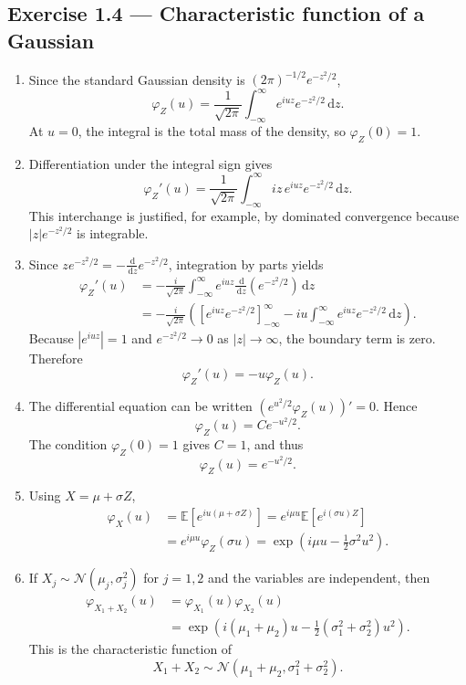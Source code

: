 \documentclass[11pt]{article}
\newcommand{\E}{\mathbb{E}}
\newcommand{\1}{\mathbf{1}}
\newcommand{\dd}{\,\mathrm{d}}
\begin{document}
\subsection*{Exercise 1.4 --- Characteristic function of a Gaussian}
\begin{enumerate}
  \item Since the standard Gaussian density is
  $(2\pi)^{-1/2}e^{-z^2/2}$,
  \[
  \varphi_Z(u)
  =\frac1{\sqrt{2\pi}}
    \int_{-\infty}^{\infty}e^{iuz}e^{-z^2/2}\dd z.
  \]
  At $u=0$, the integral is the total mass of the density, so
  $\varphi_Z(0)=1$.

  \item Differentiation under the integral sign gives
  \[
  \varphi_Z'(u)
  =\frac1{\sqrt{2\pi}}
    \int_{-\infty}^{\infty}iz\,e^{iuz}e^{-z^2/2}\dd z.
  \]
  This interchange is justified, for example, by dominated convergence
  because $|z|e^{-z^2/2}$ is integrable.

  \item Since
  $z e^{-z^2/2}=-\frac{\dd}{\dd z}e^{-z^2/2}$, integration by parts yields
  \begin{align*}
  \varphi_Z'(u)
  &=-\frac{i}{\sqrt{2\pi}}
    \int_{-\infty}^{\infty}e^{iuz}
    \frac{\dd}{\dd z}\!\left(e^{-z^2/2}\right)\dd z\\
  &=-\frac{i}{\sqrt{2\pi}}
    \left(
      \left[e^{iuz}e^{-z^2/2}\right]_{-\infty}^{\infty}
      -iu\int_{-\infty}^{\infty}e^{iuz}e^{-z^2/2}\dd z
    \right).
  \end{align*}
  Because $|e^{iuz}|=1$ and $e^{-z^2/2}\to0$ as $|z|\to\infty$, the
  boundary term is zero. Therefore
  \[
  \varphi_Z'(u)=-u\varphi_Z(u).
  \]

  \item The differential equation can be written
  $(e^{u^2/2}\varphi_Z(u))'=0$. Hence
  \[
  \varphi_Z(u)=C e^{-u^2/2}.
  \]
  The condition $\varphi_Z(0)=1$ gives $C=1$, and thus
  \[
  \boxed{\varphi_Z(u)=e^{-u^2/2}.}
  \]

  \item Using $X=\mu+\sigma Z$,
  \begin{align*}
  \varphi_X(u)
  &=\E[e^{iu(\mu+\sigma Z)}]
    =e^{i\mu u}\E[e^{i(\sigma u)Z}]\\
  &=e^{i\mu u}\varphi_Z(\sigma u)
    =\boxed{\exp\!\left(i\mu u-\frac12\sigma^2u^2\right)}.
  \end{align*}

  \item If $X_j\sim\mathcal N(\mu_j,\sigma_j^2)$ for $j=1,2$ and the
  variables are independent, then
  \begin{align*}
  \varphi_{X_1+X_2}(u)
  &=\varphi_{X_1}(u)\varphi_{X_2}(u)\\
  &=\exp\!\left(
    i(\mu_1+\mu_2)u-\frac12(\sigma_1^2+\sigma_2^2)u^2
    \right).
  \end{align*}
  This is the characteristic function of
  \[
  X_1+X_2\sim
  \mathcal N(\mu_1+\mu_2,\sigma_1^2+\sigma_2^2).
  \]
\end{enumerate}
\end{document}
